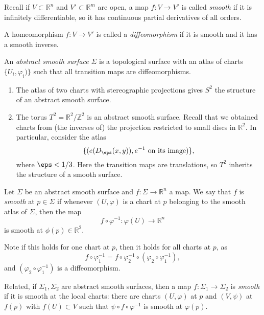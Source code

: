 \documentclass[12pt]{article}
\begin{document}
Recall if $V \subset \mathbb{R}^{n}$ and $V' \subset \mathbb{R}^{m}$ are open, a map $f : V \to V'$ is called \emph{smooth} if it is infinitely differentiable, so it has continuous partial derivatives of all orders.

A homeomorphism $f : V \to V'$ is called a \emph{diffeomorphism} if it is smooth and it has a smooth inverse.

\begin{definition}
	An \emph{abstract smooth surface} $\Sigma$ is a topological surface with an atlas of charts $\{U_i, \varphi_i)\}$ such that all transition maps are diffeomorphisms.
\end{definition}

\begin{exbox}
	\begin{enumerate}[1.]
		\item The atlas of two charts with stereographic projections gives $S^2$ the structure of an abstract smooth surface.
		\item The torus $T^2 = \mathbb{R}^2 / \mathbb{Z}^2$ is an abstract smooth surface. Recall that we obtained charts from (the inverses of) the projection restricted to small discs in $\mathbb{R}^2$. In particular, consider the atlas
			\[
				\{(e(D_{\eps}(x,y)), e^{-1} \text{ on its image})\}
			,\]
			where $\eps < 1/3$. Here the transition maps are translations, so $T^2$ inherits the structure of a smooth surface.
	\end{enumerate}
\end{exbox}

\begin{definition}
	Let $\Sigma$ be an abstract smooth surface and $f : \Sigma \to \mathbb{R}^{n}$ a map. We say that $f$ is \emph{smooth} at $p \in \Sigma$ if whenever $(U, \varphi)$ is a chart at $p$ belonging to the smooth atlas of $\Sigma$, then the map
	\[
	f \circ \varphi^{-1} : \varphi(U) \to \mathbb{R}^{n}
	\]
	is smooth at $\phi(p) \in \mathbb{R}^2$.
\end{definition}

Note if this holds for one chart at $p$, then it holds for all charts at $p$, as
\[
f \circ \varphi_1^{-1} = f \circ \varphi_2^{-1} \circ (\varphi_2 \circ \varphi_1^{-1})
,\]
and $(\varphi_2 \circ \varphi_1^{-1})$ is a diffeomorphism.

Related, if $\Sigma_1, \Sigma_2$ are abstract smooth surfaces, then a map $f : \Sigma_1 \to \Sigma_2$ is \emph{smooth} if it is smooth at the local charts: there are charts $(U, \varphi)$ at $p$ and $(V, \psi)$ at $f(p)$ with $f(U) \subset V$ such that $\psi \circ f \circ \varphi^{-1}$ is smooth at $\varphi(p)$.
\end{document}
